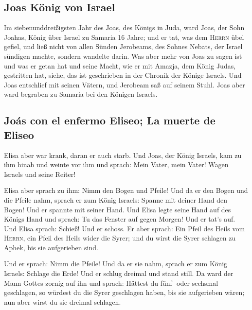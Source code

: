\hypertarget{joas-kuxf6nig-von-israel}{%
\subsection{Joas König von Israel}\label{joas-kuxf6nig-von-israel}}

 Im siebenunddreißigsten Jahr des Joas, des Königs in
Juda, ward Joas, der Sohn Joahas, König über Israel zu Samaria 16 Jahre;
 und er tat, was dem \textsc{Herrn} übel gefiel, und ließ
nicht von allen Sünden Jerobeams, des Sohnes Nebats, der Israel sündigen
machte, sondern wandelte darin.  Was aber mehr von Joas
zu sagen ist und was er getan hat und seine Macht, wie er mit Amazja,
dem König Judas, gestritten hat, siehe, das ist geschrieben in der
Chronik der Könige Israels.  Und Joas entschlief mit
seinen Vätern, und Jerobeam saß auf seinem Stuhl. Joas aber ward
begraben zu Samaria bei den Königen Israels.

\hypertarget{jouxe1s-con-el-enfermo-eliseo-la-muerte-de-eliseo}{%
\subsection{Joás con el enfermo Eliseo; La muerte de
Eliseo}\label{jouxe1s-con-el-enfermo-eliseo-la-muerte-de-eliseo}}

 Elisa aber war krank, daran er auch starb. Und Joas, der
König Israels, kam zu ihm hinab und weinte vor ihm und sprach: Mein
Vater, mein Vater! Wagen Israels und seine Reiter!

 Elisa aber sprach zu ihm: Nimm den Bogen und Pfeile! Und
da er den Bogen und die Pfeile nahm,  sprach er zum König
Israels: Spanne mit deiner Hand den Bogen! Und er spannte mit seiner
Hand. Und Elisa legte seine Hand auf des Königs Hand  und
sprach: Tu das Fenster auf gegen Morgen! Und er tat's auf. Und Elisa
sprach: Schieß! Und er schoss. Er aber sprach: Ein Pfeil des Heils vom
\textsc{Herrn}, ein Pfeil des Heils wider die Syrer; und du wirst die
Syrer schlagen zu Aphek, bis sie aufgerieben sind.

 Und er sprach: Nimm die Pfeile! Und da er sie nahm,
sprach er zum König Israels: Schlage die Erde! Und er schlug dreimal und
stand still.  Da ward der Mann Gottes zornig auf ihn und
sprach: Hättest du fünf- oder sechsmal geschlagen, so würdest du die
Syrer geschlagen haben, bis sie aufgerieben wären; nun aber wirst du sie
dreimal schlagen.

